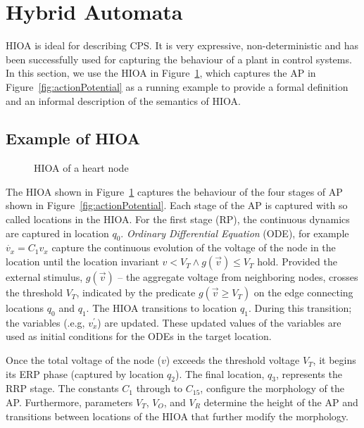 \section{Hybrid Automata}
\label{sec:HA}


\acf{HIOA} is ideal for describing \ac{CPS}. It is very expressive,
non-deterministic and has been successfully used for capturing the
behaviour of a plant in control systems.  In this section, we use the
\ac{HIOA} in Figure~\ref{fig:heartCellHA}, which captures the \ac{AP} in
Figure~\ref{fig:actionPotential} as a running example to provide a
formal definition and an informal description of the semantics of
\ac{HIOA}.



\subsection{Example of \acf{HIOA} }

\begin{figure}
  \centering
  
  \caption{\acf{HIOA} of a heart node \label{fig:heartCellHA}}
\end{figure}

The \ac{HIOA} shown in Figure~\ref{fig:heartCellHA} captures the
behaviour of the four stages of \ac{AP} shown in
Figure~\ref{fig:actionPotential}. Each stage of the \ac{AP} is captured
with so called locations in the \ac{HIOA}. For the first stage
(\ac{RP}), the continuous dynamics are captured in location
$q_0$. \textit{Ordinary Differential Equation} (ODE), for example
\mbox{$\dot{v_{x}} = C_{1}v_{x}$} capture the continuous evolution of
the voltage of the node in the location until the location invariant
$v < V_{T} \wedge g(\vec{v}) \leq V_{T}$ hold. Provided the external
stimulus, $g(\vec{v})$ -- the aggregate voltage from neighboring nodes,
crosses the threshold $V_{T}$, indicated by the predicate
\mbox{$g(\vec{v} \geq V_{T})$} on the edge connecting locations $q_{0}$
and $q_{1}$. The \ac{HIOA} transitions to location $q_{1}$. During this
transition; the variables (.e.g, $v^{\prime}_{x}$) are updated. These
updated values of the variables are used as initial conditions for the
ODEs in the target location. 

Once the total voltage of the node ($v$) exceeds the threshold voltage
$V_{T}$, it begins its \ac{ERP} phase (captured by location $q_2$). The
final location, $q_3$, represents the \ac{RRP} stage.  The constants
$C_1$ through to $C_{15}$, configure the morphology of the
\ac{AP}. Furthermore, parameters $V_T$, $V_O$, and $V_R$ determine the
height of the \ac{AP} and transitions between locations of the \ac{HIOA}
that further modify the morphology.

